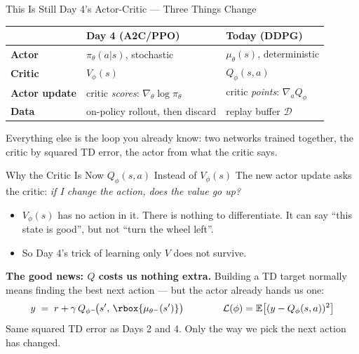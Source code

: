 
\begin{frame}{This Is Still Day 4's Actor-Critic --- Three Things Change}
\vspace{-0.2em}
\begin{center}
\small
\renewcommand{\arraystretch}{1.5}
\begin{tabular}{p{} p{} p{}}
\hline
 & \textbf{Day 4 (A2C/PPO)} & \textbf{Today (DDPG)} \\
\hline
\textbf{Actor} & $\pi_\theta(a|s)$, stochastic & $\mu_\theta(s)$, deterministic \\
\textbf{Critic} & $V_\phi(s)$ & $Q_\phi(s,a)$ \\
\textbf{Actor update} & critic \emph{scores}: $\nabla_\theta \log \pi_\theta$ & critic \emph{points}: $\nabla_a Q_\phi$ \\
\textbf{Data} & on-policy rollout, then discard & replay buffer $\mathcal{D}$ \\
\hline
\end{tabular}
\end{center}
\vspace{0.8em}
\centering
Everything else is the loop you already know: two networks trained together, the critic by squared TD error, the actor from what the critic says.
\end{frame}

\begin{frame}{Why the Critic Is Now $Q_\phi(s,a)$ Instead of $V_\phi(s)$}
\vspace{0.6em}
The new actor update asks the critic: \emph{if I change the action, does the value go up?}
\vspace{0.4em}
\begin{itemize}
    \setlength{\itemsep}{0.5em}
    \item $V_\phi(s)$ has no action in it. There is nothing to differentiate. It can say ``this state is good'', but not ``turn the wheel left''.
    \item So Day 4's trick of learning only $V$ does not survive.
\end{itemize}
\pause
\vspace{0.9em}

\textbf{The good news: $Q$ costs us nothing extra.} Building a TD target normally means finding the best next action --- but the actor already hands us one:
\[
y \;=\; r + \gamma\, Q_{\phi^{-}}\!\big(s',\, \rbox{\mu_{\theta^{-}}(s')}\big)
\qquad\qquad
\mathcal{L}(\phi) = \mathbb{E}\big[(y - Q_\phi(s,a))^2\big]
\]
\vspace{0.2em}
\centering
Same squared TD error as Days 2 and 4. Only the way we pick the next action has changed.
\end{frame}
